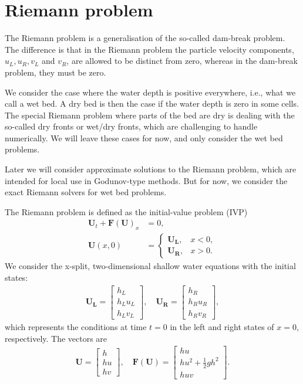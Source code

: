 \section{Riemann problem}
The Riemann problem is a generalisation of the so-called dam-break problem.
The difference is that in the Riemann problem the particle velocity components, $u_L, u_R, v_L$ and $v_R$, are allowed to be distinct from zero, whereas in the dam-break problem, they must be zero.

We consider the case where the water depth is positive everywhere, i.e., what we call a wet bed.
A dry bed is then the case if the water depth is zero in some cells.
The special Riemann problem where parts of the bed are dry is dealing with the so-called dry fronts or wet/dry fronts, which are challenging to handle numerically.
We will leave these cases for now, and only consider the wet bed problems.

Later we will consider approximate solutions to the Riemann problem, which are intended for local use in Godunov-type methods.
But for now, we consider the exact Riemann solvers for wet bed problems.

The Riemann problem is defined as the initial-value problem (IVP)
\begin{align}\label{eq:Riemann_problem}
    \mathbf{U}_t + {\mathbf{F(U)}}_x &= 0, \\
\mathbf{U}(x, 0) &= \begin{cases}
    \mathbf{U_L}, & x < 0, \\
    \mathbf{U_R}, & x > 0.
\end{cases}
\end{align}
We consider the x-split, two-dimensional shallow water equations with the initial states:
\begin{align*}
    \mathbf{U_L} = \begin{bmatrix}
        h_L \\ h_L u_L \\ h_L v_L
    \end{bmatrix}, \quad 
    \mathbf{U_R} = \begin{bmatrix}
        h_R \\ h_R u_R \\ h_R v_R
    \end{bmatrix},
\end{align*}
which represents the conditions at time $t = 0$ in the left and right states of $x=0$, respectively.
The vectors are
\begin{align*}
    \mathbf{U} = \begin{bmatrix}
        h \\ hu \\ hv
    \end{bmatrix}, \quad 
    \mathbf{F(U)} = \begin{bmatrix}
        hu \\ hu^2 + \frac{1}{2}gh^2 \\ huv
    \end{bmatrix}.
\end{align*}

